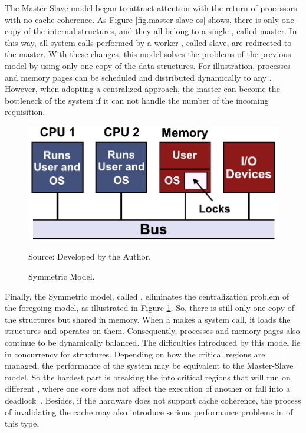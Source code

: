 			The Master-Slave model began to attract attention with the return of
			processors with no cache coherence.
			As Figure \ref{fig.master-slave-os} shows, there is only one copy of
			the internal \os structures, and they all belong to a single \cpu, called master.
			In this way, all system calls performed by a worker \cpu, called slave,
			are redirected to the master.
			With these changes, this model solves the problems of the previous model
			by using only one copy of the data structures.
			For illustration, processes and memory pages can be scheduled and
			distributed dynamically to any \cpus.
			However, when adopting a centralized approach, the master can become
			the bottleneck of the system if it can not handle the number of the
			incoming requisition.

			\begin{figure}[h]
				\centering
				\caption{Symmetric \os Model.}

				\includegraphics[width=.7\textwidth]{images/symmetric-os.pdf}

				Source: Developed by the Author.

				\label{fig.smp-os}
			\end{figure}

			Finally, the Symmetric model, called \smp, eliminates the centralization
			problem of the foregoing model, as illustrated in Figure \ref{fig.smp-os}.
			So, there is still only one copy of the \os structures but shared in memory.
			When a \cpu makes a system call, it loads the structures and operates on them.
			Consequently, processes and memory pages also continue to be dynamically balanced.
			The difficulties introduced by this model lie in concurrency for \os structures.
			Depending on how the critical regions are managed, the performance of the system
			may be equivalent to the Master-Slave model. So the hardest part is breaking the
			\os into critical regions that will run on different \cpus, where one core does
			not affect the execution of another or fall into a deadlock~\cite{tanenbaum:4ed}.
			Besides, if the hardware does not support cache coherence, the process of
			invalidating the cache may also introduce serious performance problems in \oses of this type.


